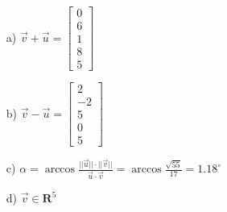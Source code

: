 \begin{itemize}
\item[a) ] $\vec{v}+\vec{u}=\begin{bmatrix}0 \\ 6 \\ 1 \\ 8 \\ 5 \end{bmatrix}$
\item[b) ] $\vec{v}-\vec{u}=\begin{bmatrix}2 \\ -2 \\ 5 \\ 0 \\ 5 \end{bmatrix}$
\item[c) ] $\alpha = \arccos{\frac{||\vec{u}|| \cdot ||\vec{v}||}{\vec{u} \cdot \vec{v}}} = \arccos{\frac{\sqrt{55}}{17}}=1.18^{\circ}$ 
\item[d) ] $\vec{v} \in \mathbf{R}^{5}$
\end{itemize}
